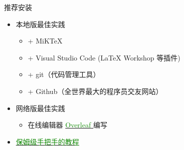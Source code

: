\begin{frame}{推荐安装}
    \begin{itemize}
      \item<+-> 本地版最佳实践
    
        \begin{itemize}
            \item + MiK\TeX{}
            \item + Visual Studio Code (LaTeX Workshop 等插件)
            \item + git（代码管理工具）
            \item + Github（全世界最大的程序员交友网站）
        \end{itemize}
      
      \item<+-> 网络版最佳实践
        \begin{itemize}
          \item 在线编辑器 \href{https://cn.overleaf.com}{\textcolor[HTML]{138a07}{Overleaf} \faLink} 编写
        \end{itemize}

      \item<+-> \href{https://suepaper.github.io/math201/docs/latex/}{\textcolor[HTML]{138a07}{保姆级手把手的教程} \faLink}

    \end{itemize}
\end{frame}

